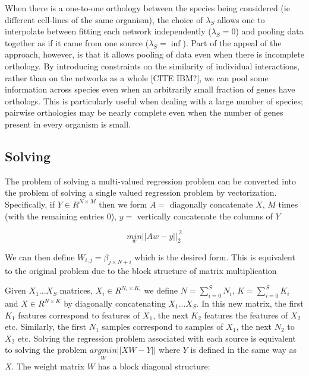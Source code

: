 \documentclass[11pt]{article}
\begin{document}
When there is a one-to-one orthology between the species being considered (ie different cell-lines of the same organism), the choice of $\lambda_S$ allows one to interpolate between fitting each network independently ($\lambda_S=0$) and pooling data together as if it came from one source ($\lambda_S=\inf$). Part of the appeal of the approach, however, is that it allows pooling of data even when there is incomplete orthology. By introducing constraints on the similarity of individual interactions, rather than on the networks as a whole [CITE IBM?], we can pool some information across species even when an arbitrarily small fraction of genes have orthologs. This is particularly useful when dealing with a large number of species; pairwise orthologies may be nearly complete even when the number of genes present in every organism is small. 

\subsection{Solving}
The problem of solving a multi-valued regression problem can be converted into the problem of solving a single valued regression problem by vectorization.
Specifically, if $Y \in R^{N \times M}$ then we form $A =$ diagonally concatenate $X$, $M$ times (with the remaining entries 0),
$y =$ vertically concatenate the columns of $Y$

$$\underset{w}{min} ||Aw - y||_2^{~2}$$

We can then define $W_{i,j} = \beta_{j \times N + i}$ which is the desired form.
This is equivalent to the original problem due to the block structure of matrix multiplication

Given $X_1... X_S$ matrices, $X_i \in R^{N_i \times K_i}$ we define $N = \sum_{i=0}^S N_i$, $K = \sum_{i=0}^SK_i$ and $X \in R^{N \times K}$ by diagonally concatenating $X_1...X_S$.
In this new matrix, the first $K_1$ features correspond to features of $X_1$, the next $K_2$ features the features of $X_2$ etc.
Similarly, the first $N_1$ samples correspond to samples of $X_1$, the next $N_2$ to $X_2$ etc.
Solving the regression problem associated with each source is equivalent to solving the problem $\underset{W}{argmin}||XW-Y||$ where $Y$ is defined in the same way as $X$.
The weight matrix $W$ has a block diagonal structure:
\end{document}
